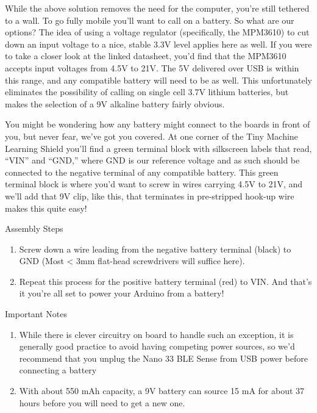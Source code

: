 While the above solution removes the need for the computer, you’re still tethered to a wall. To go fully mobile you’ll want to call on a battery. So what are our options? The idea of using a voltage regulator (specifically, the MPM3610) to cut down an input voltage to a nice, stable 3.3V level applies here as well. If you were to take a closer look at the linked datasheet, you’d find that the MPM3610 accepts input voltages from 4.5V to 21V. The 5V delivered over USB is within this range, and any compatible battery will need to be as well. This unfortunately eliminates the possibility of calling on single cell 3.7V lithium batteries, but makes the selection of a 9V alkaline battery fairly obvious.

You might be wondering how any battery might connect to the boards in front of you, but never fear, we’ve got you covered. At one corner of the Tiny Machine Learning Shield you’ll find a green terminal block with silkscreen labels that read, “VIN” and “GND,” where GND is our reference voltage and as such should be connected to the negative terminal of any compatible battery. This green terminal block is where you’d want to screw in wires carrying 4.5V to 21V, and we’ll add that 9V clip, like this, that terminates in pre-stripped hook-up wire makes this quite easy!

\bigskip

Assembly Steps

\begin{enumerate}
    \item Screw down a wire leading from the negative battery terminal (black) to GND (Most < 3mm flat-head screwdrivers will suffice here).
    \item Repeat this process for the positive battery terminal (red) to VIN. And that's it you're all set to power your Arduino from a battery!
\end{enumerate}


\bigskip

Important Notes

\begin{enumerate}
    \item While there is clever circuitry on board to handle such an exception, it is generally good practice to avoid having competing power sources, so we’d recommend that you unplug the Nano 33 BLE Sense from USB power before connecting a battery
    
    \item With about 550 mAh capacity, a 9V battery can source 15 mA for about 37 hours before you will need to get a new one.
\end{enumerate}



